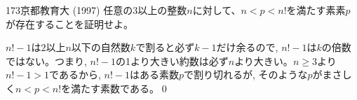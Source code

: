 \begin{thm}{173}{}{京都教育大 (1997)}
 任意の3以上の整数$n$に対して、$n<p<n!$を満たす素素$p$が存在することを証明せよ。
\end{thm}

$n! - 1$は$2$以上$n$以下の自然数$k$で割ると必ず$k-1$だけ余るので, $n!-1$は$k$の倍数ではない。つまり, $n!-1$の1より大きい約数は必ず$n$より大きい。$n\geq 3$より$n!-1>1$であるから, $n!-1$はある素数$p$で割り切れるが, そのような$p$がまさしく$n < p < n!$を満たす素数である。\qed